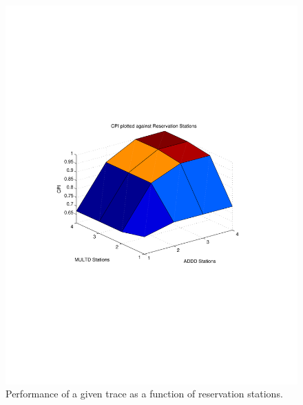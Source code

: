 \documentclass[twocolumn,letterpaper,10pt]{article}
\begin{document}
\begin{figure}[bht]
\includegraphics[scale=.5, clip=true, viewport=100 230 500 550]{CPI.pdf}
\caption{Performance of a given trace as a function of reservation stations.}
\label{fig:plot1}
\end{figure}


\end{document}
